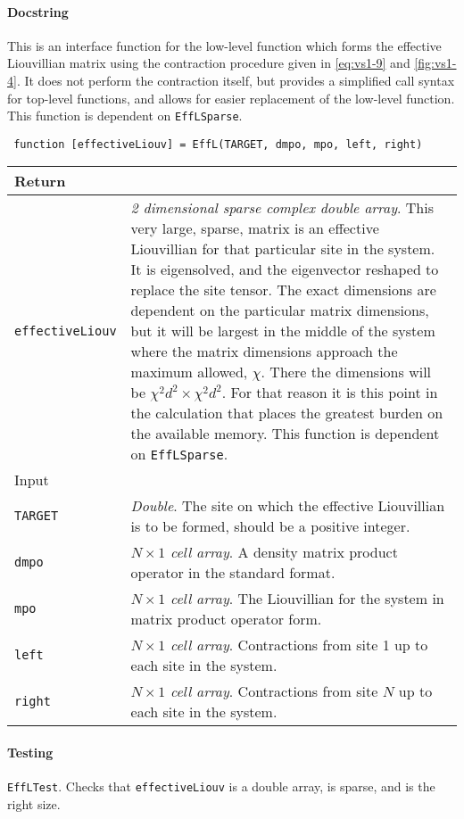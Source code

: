  \paragraph{Docstring} This is an interface function for the low-level function which forms the effective Liouvillian matrix using the contraction procedure given in \cref{eq:vs1-9} and \cref{fig:vs1-4}. It does not perform the contraction itself, but provides a simplified call syntax for top-level functions, and allows for easier replacement of the low-level function. This function is dependent on \lstinline$EffLSparse$.
 \begin{lstlisting}
 function [effectiveLiouv] = EffL(TARGET, dmpo, mpo, left, right) \end{lstlisting}
 \begin{longtabu}{X[1,1]X[4,1]}
 \hline
 Return & \\ \hline
 \lstinline$effectiveLiouv$ & \emph{2 dimensional sparse complex double array}. This very large, sparse, matrix is an effective Liouvillian for that particular site in the system. It is eigensolved, and the eigenvector reshaped to replace the site tensor. The exact dimensions are dependent on the particular matrix dimensions, but it will be largest in the middle of the system where the matrix dimensions approach the maximum allowed, \(\chi\). There the dimensions will be \(\chi^{2}d^{2} \times \chi^{2}d^{2}\). For that reason it is this point in the calculation that places the greatest burden on the available memory. This function is dependent on \lstinline$EffLSparse$. \\ \hline
 Input & \\ \hline
 \lstinline$TARGET$ & \emph{Double}. The site on which the effective Liouvillian is to be formed, should be a positive integer. \\
 \lstinline$dmpo$ & \emph{\(N \times 1\) cell array}. A density matrix product operator in the standard format. \\
 \lstinline$mpo$ & \emph{\(N \times 1\) cell array}. The Liouvillian for the system in matrix product operator form. \\
 \lstinline$left$ & \emph{\(N \times 1\) cell array}. Contractions from site 1 up to each site in the system. \\
 \lstinline$right$ & \emph{\(N \times 1\) cell array}. Contractions from site \(N\) up to each site in the system. \\
 \hline
 \end{longtabu}
 \paragraph{Testing} \lstinline$EffLTest$. Checks that \lstinline$effectiveLiouv$ is a double array, is sparse, and is the right size.

